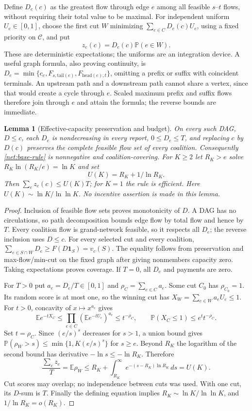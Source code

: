 \documentclass[11pt]{article}
\newtheorem{lemma}[theorem]{Lemma}
\theoremstyle{definition}\newtheorem{definition}[theorem]{Definition}
\theoremstyle{remark}\newtheorem{remark}[theorem]{Remark}
\newcommand{\E}{\mathbb E}
\newcommand{\Prob}{\mathbb P}
\newcommand{\ind}{\mathbf 1}
\begin{document}
Define $D_e(c)$ as the greatest flow through edge $e$ among all feasible
$s$--$t$ flows, without requiring their total value to be maximal.
For independent uniform $U_e\in[0,1]$, choose the first cut $W$ minimizing
$\sum_{e\in C}D_e(c)U_e$, using a fixed priority on $\mathcal C$, and put
\begin{equation}\label{net:base-rule}
 z_e(c)=D_e(c)\Prob(e\in W).
\end{equation}
These are deterministic expectations; the uniforms are an integration device.
A useful graph formula, also proving continuity, is
$D_e=\min\{c_e,F_{s,\mathrm{tail}(e)},F_{\mathrm{head}(e),t}\}$,
omitting a prefix or suffix with coincident terminals.  An upstream path and
a downstream path cannot share a vertex, since that would create a cycle
through $e$.  Scaled maximum prefix and suffix flows therefore join through
$e$ and attain the formula; the reverse bounds are immediate.

\begin{lemma}[Effective-capacity preservation and budget]
\label{net:preservation}
On every such DAG, $D\le c$, each $D_e$ is nondecreasing in every report,
$0\le D_e\le T$, and replacing $c$ by $D(c)$ preserves the complete feasible
flow set of every coalition.  Consequently \eqref{net:base-rule} is
nonnegative and coalition-covering.  For $K\ge2$ let $R_K>e$ solve
$R_K\ln(R_K/e)=\ln K$ and set
\[
 U(K)=R_K+1/\ln R_K.
\]
Then $\sum_ez_e(c)\le U(K)T$; for $K=1$ the rule is efficient.
Here $U(K)\sim\ln K/\ln\ln K$.  No incentive assertion is made in this lemma.
\end{lemma}
\begin{proof}
Inclusion of feasible flow sets proves monotonicity of $D$.  A DAG has no
circulations, so path decomposition bounds edge flow by total flow and hence
by $T$.  Every coalition flow is grand-network feasible, so it respects all
$D_e$; the reverse inclusion uses $D\le c$.
For every selected cut and every coalition,
$\sum_{e\in S\cap W}D_e\ge F(D\ind_S)=v_c(S)$.
The equality follows from preservation and max-flow/min-cut on the fixed
graph after giving nonmembers capacity zero.  Taking expectations proves
coverage.  If $T=0$, all $D_e$ and payments are zero.

For $T>0$ put $a_e=D_e/T\in[0,1]$ and $\rho_C=\sum_{e\in C}a_e$.
Some cut $C_0$ has $\rho_{C_0}=1$.  Its random score is at most one, so the
winning cut has $X_W=\sum_{e\in W}a_eU_e\le1$.
For $t>0$, concavity of $x\mapsto x^{a_e}$ gives
\[
 \E e^{-tX_C}\le\prod_{e\in C}(\E e^{-tU_e})^{a_e}
 \le t^{-\rho_C},\qquad
 \Prob(X_C\le1)\le e^t t^{-\rho_C}.
\]
Set $t=\rho_C$.  Since $(e/s)^s$ decreases for $s>1$, a union bound gives
$\Prob(\rho_W>s)\le\min\{1,K(e/s)^s\}$ for $s\ge e$.
Beyond $R_K$ the logarithm of the second bound has derivative
$-\ln s\le-\ln R_K$.  Therefore
\[
 \frac{\sum_ez_e}{T}=\E\rho_W
 \le R_K+\int_{R_K}^\infty e^{-(s-R_K)\ln R_K}\,ds=U(K).
\]
Cut scores may overlap; no independence between cuts was used.
With one cut, its $D$-sum is $T$.  Finally the defining equation implies
$R_K\sim\ln K/\ln\ln K$, and $1/\ln R_K=o(R_K)$.
\end{proof}
\end{document}
